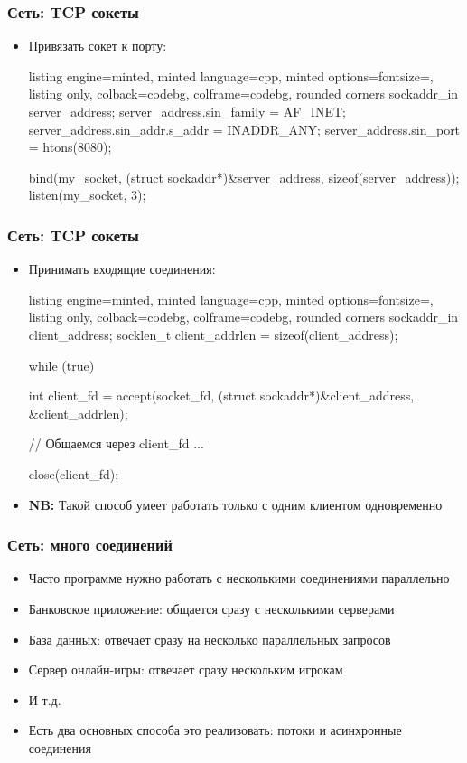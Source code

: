 \documentclass[10pt]{beamer}
\begin{document}
\begin{frame}[fragile]
\frametitle{Сеть: TCP сокеты}
\begin{itemize}
\item Привязать сокет к порту:
\begin{tcblisting}{listing engine=minted, minted language=cpp, minted options={fontsize=\scriptsize}, listing only, colback=codebg, colframe=codebg, rounded corners}
sockaddr_in server_address{};
server_address.sin_family = AF_INET;
server_address.sin_addr.s_addr = INADDR_ANY;
server_address.sin_port = htons(8080);

bind(my_socket, (struct sockaddr*)&server_address,
  sizeof(server_address));
listen(my_socket, 3);
\end{tcblisting}
\end{itemize}
\end{frame}

\begin{frame}[fragile]
\frametitle{Сеть: TCP сокеты}
\begin{itemize}
\item Принимать входящие соединения:
\begin{tcblisting}{listing engine=minted, minted language=cpp, minted options={fontsize=\scriptsize}, listing only, colback=codebg, colframe=codebg, rounded corners}
sockaddr_in client_address{};
socklen_t client_addrlen = sizeof(client_address);

while (true)
{
  int client_fd = accept(socket_fd,
    (struct sockaddr*)&client_address,
    &client_addrlen);

  // Общаемся через client_fd ...

  close(client_fd);
}
\end{tcblisting}
\pause
\item \textbf{NB:} Такой способ умеет работать только с одним клиентом одновременно
\end{itemize}
\end{frame}

\begin{frame}[fragile]
\frametitle{Сеть: много соединений}
\begin{itemize}
\item Часто программе нужно работать с несколькими соединениями параллельно
\pause
\item Банковское приложение: общается сразу с несколькими серверами
\pause
\item База данных: отвечает сразу на несколько параллельных запросов
\pause
\item Сервер онлайн-игры: отвечает сразу нескольким игрокам
\pause
\item И т.д.
\pause
\item Есть два основных способа это реализовать: потоки и асинхронные соединения
\end{itemize}
\end{frame}
\end{document}
